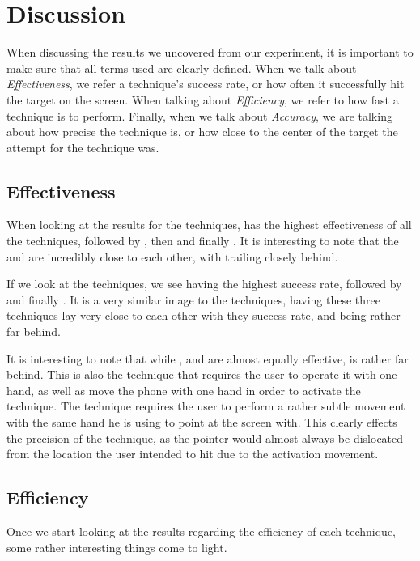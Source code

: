 \section{Discussion}\label{sec:discussion}
When discussing the results we uncovered from our experiment, it is important to make sure that all terms used are clearly defined. When we talk about \emph{Effectiveness}, we refer a technique's success rate, or how often it successfully hit the target on the screen. When talking about \emph{Efficiency}, we refer to how fast a technique is to perform. Finally, when we talk about \emph{Accuracy}, we are talking about how precise the technique is, or how close to the center of the target the attempt for the technique was. 

\subsection{Effectiveness}

When looking at the results for the \push techniques, \grab has the highest effectiveness of all the techniques, followed by \swipe, then \throw and finally \tilt. It is interesting to note that the \grab and \swipe are incredibly close to each other, with \throw trailing closely behind. 

If we look at the \pull techniques, we see \swipe having the highest success rate, followed by \throw and finally \grab. It is a very similar image to the \push techniques, having these three techniques lay very close to each other with they success rate, and \tilt being rather far behind.  

It is interesting to note that while \grab, \swipe and \throw are almost equally effective, \tilt is rather far behind. This is also the technique that requires the user to operate it with one hand, as well as move the phone with one hand in order to activate the technique. The technique requires the user to perform a rather subtle movement with the same hand he is using to point at the screen with. This clearly effects the precision of the technique, as the pointer would almost always be dislocated from the location the user intended to hit due to the activation movement.

\subsection{Efficiency}

Once we start looking at the results regarding the efficiency of each technique, some rather interesting things come to light.

